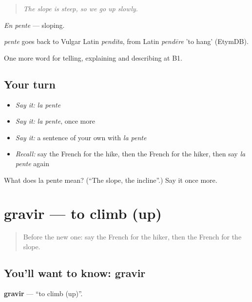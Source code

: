 \begin{quote}
\emph{The slope is steep, so we go up slowly.}
\end{quote}

\emph{En pente} — sloping.

\begin{cousinweb}
\emph{pente} goes back to Vulgar Latin \emph{pendita}, from Latin \emph{pendēre} 'to hang' (EtymDB).
\end{cousinweb}

\begin{grammarlens}[title={What you've built}]
One more word for telling, explaining and describing at B1.
\end{grammarlens}

\subsection*{Your turn}
\begin{itemize}
\raggedright
  \item \emph{Say it:} \emph{la pente}
  \item \emph{Say it:} \emph{la pente}, once more
  \item \emph{Say it:} a sentence of your own with \emph{la pente}
  \item \emph{Recall:} say the French for the hike, then the French for the hiker, then say \emph{la pente} again
\end{itemize}

\begin{tcolorbox}[breakable,colback=teal!4,colframe=teal!35!black,title={Before you move on}]
What does la pente mean? (\textquotedblleft{}The slope, the incline\textquotedblright{}.) Say it once more.
\end{tcolorbox}
\section[gravir]{gravir — to climb (up)}

\label{lesson:FR-C455-gravir}



\begin{quote}
Before the new one: say the French for the hiker, then the French for the slope.
\end{quote}

\subsection*{You'll want to know: gravir}
\textbf{gravir} — \textquotedblleft{}to climb (up)\textquotedblright{}.

